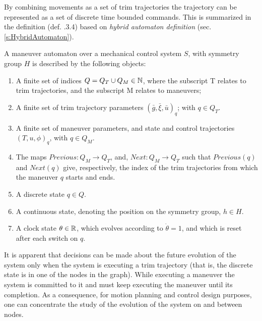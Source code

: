 By combining movements as a set of trim trajectories the trajectory can be represented as a set of discrete time bounded commands. This is summarized in the definition (def. \cite{frazzoli2001robust}.3.4) based on \emph{hybrid automaton definition} (sec. \ref{s:HybridAutomaton}).
\begin{definition} A maneuver automaton over a mechanical control system $S$, with symmetry group $H$ is described by the following objects:

\begin{enumerate}
    \item A finite set of indices $Q = Q_T \cup Q_M \in \mathbb{N}$, where the subscript T relates to trim trajectories, and the subscript M relates to maneuvers;
    
    \item A finite set of trim trajectory parameters $\left(\bar{g},\bar{\xi},\bar{u}\right)_q$; with $q\in Q_T$.
    
    \item A finite set of maneuver parameters, and state and control trajectories $\left(T,u,\phi\right)_q$, with $q\in Q_M$.
    
    \item The maps $Previous: Q_M\to Q_T $, and, $Next: Q_M \to Q_T$ such that $Previous(q)$ and $Next(q)$ give, respectively, the index of the trim trajectories from which the maneuver $q$ starts and ends.
    
    \item A discrete state $q \in Q$.
    
    \item A continuous state, denoting the position on the symmetry group, $h \in H$.
    
    \item A clock state $\theta \in \mathbb{R}$, which evolves according to $\dot{\theta}=1$, and which is reset after each switch on $q$.
\end{enumerate}
\begin{note}
    It is apparent that decisions can be made about the future evolution of the system only when the system is executing a trim trajectory (that is, the discrete state is in one of the nodes in the graph). While executing a maneuver the system is committed to it and must keep executing the maneuver until its completion. As a consequence, for motion planning and control design purposes, one can concentrate the study of the evolution of the system on and between nodes.
\end{note}
\end{definition}


